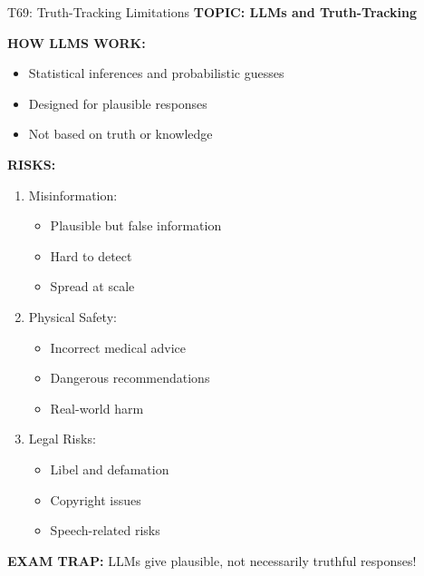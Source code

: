 \documentclass[8pt]{beamer}
\begin{document}
	\begin{frame}{T69: Truth-Tracking Limitations}
		\fontsize{6.5}{7.5}\selectfont
		\textbf{TOPIC: LLMs and Truth-Tracking}
		
		\vspace{0.1cm}
		\textbf{HOW LLMS WORK:}
		\begin{itemize}
			\item Statistical inferences and probabilistic guesses
			\item Designed for plausible responses
			\item Not based on truth or knowledge
		\end{itemize}
		
		\vspace{0.1cm}
		\textbf{RISKS:}
		\begin{enumerate}
			\item \textcolor{myblue}{Misinformation:}
			\begin{itemize}
				\item Plausible but false information
				\item Hard to detect
				\item Spread at scale
			\end{itemize}
			\item \textcolor{myblue}{Physical Safety:}
			\begin{itemize}
				\item Incorrect medical advice
				\item Dangerous recommendations
				\item Real-world harm
			\end{itemize}
			\item \textcolor{myblue}{Legal Risks:}
			\begin{itemize}
				\item Libel and defamation
				\item Copyright issues
				\item Speech-related risks
			\end{itemize}
		\end{enumerate}
		
		\textcolor{myred}{\textbf{EXAM TRAP:}} LLMs give \textcolor{myblue}{plausible, not necessarily truthful} responses!
	\end{frame}
	
\end{document}
